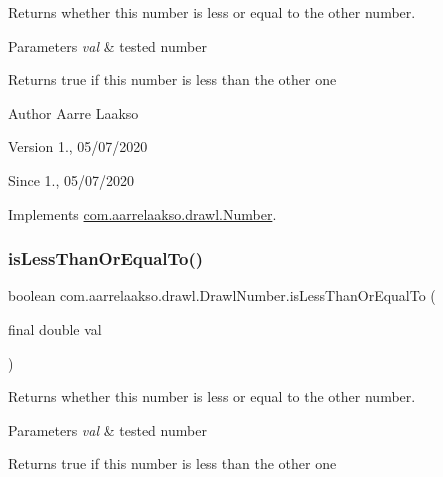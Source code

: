 Returns whether this number is less or equal to the other number. 


\begin{DoxyParams}{Parameters}
{\em val} & tested number \\
\hline
\end{DoxyParams}
\begin{DoxyReturn}{Returns}
true if this number is less than the other one 
\end{DoxyReturn}
\begin{DoxyAuthor}{Author}
Aarre Laakso 
\end{DoxyAuthor}
\begin{DoxyVersion}{Version}
1., 05/07/2020 
\end{DoxyVersion}
\begin{DoxySince}{Since}
1., 05/07/2020 
\end{DoxySince}


Implements \hyperlink{interfacecom_1_1aarrelaakso_1_1drawl_1_1_number_a195d37075fcef873df2907194e794836}{com.\+aarrelaakso.\+drawl.\+Number}.

\mbox{\label{classcom_1_1aarrelaakso_1_1drawl_1_1_drawl_number_af112edcaa36d2518baab553fe11d39fe}} 
\subsubsection{\texorpdfstring{is\+Less\+Than\+Or\+Equal\+To()}{isLessThanOrEqualTo()}\hspace{0.1cm}{\footnotesize\ttfamily [2/2]}}
{\footnotesize\ttfamily boolean com.\+aarrelaakso.\+drawl.\+Drawl\+Number.\+is\+Less\+Than\+Or\+Equal\+To (\begin{DoxyParamCaption}\item[{final double}]{val }\end{DoxyParamCaption})}



Returns whether this number is less or equal to the other number. 


\begin{DoxyParams}{Parameters}
{\em val} & tested number \\
\hline
\end{DoxyParams}
\begin{DoxyReturn}{Returns}
true if this number is less than the other one 
\end{DoxyReturn}


